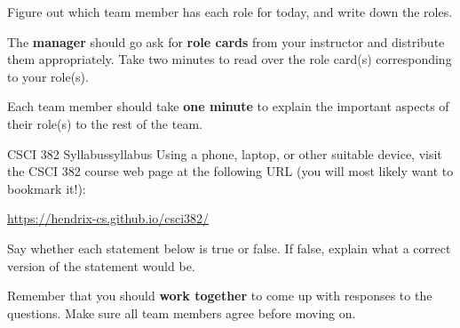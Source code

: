 \documentclass{tufte-handout}
\begin{document}
\begin{questions}
\item Figure out which team member has each role for today, and write
  down the roles.
\item The \textbf{manager} should go ask for \textbf{role cards}
  from your instructor and distribute them appropriately.  Take two
  minutes to read over the role card(s) corresponding to your role(s).
\item Each team member should take \textbf{one minute} to explain the
  important aspects of their role(s) to the rest of the team.
\end{questions}

\newpage
\begin{model*}{CSCI 382 Syllabus}{syllabus}
  Using a phone, laptop, or other suitable device, visit the CSCI 382
  course web page at the following URL (you will most likely want to
  bookmark it!): \bigskip

  \url{https://hendrix-cs.github.io/csci382/}
\end{model*}

Say whether each statement below is true or false.  If false, explain
what a correct version of the statement would be.

Remember that you should \textbf{work together} to come up with
responses to the questions.  Make sure all team members agree before
moving on.
\end{document}
